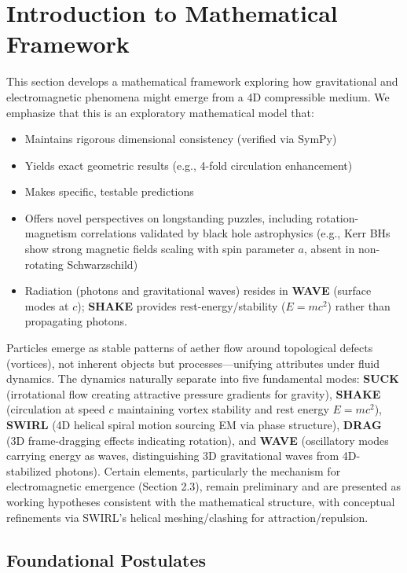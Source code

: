 \section{Introduction to Mathematical Framework}

This section develops a mathematical framework exploring how gravitational and electromagnetic phenomena might emerge from a 4D compressible medium. We emphasize that this is an exploratory mathematical model that:
\begin{itemize}
\item Maintains rigorous dimensional consistency (verified via SymPy)
\item Yields exact geometric results (e.g., 4-fold circulation enhancement)
\item Makes specific, testable predictions
\item Offers novel perspectives on longstanding puzzles, including rotation-magnetism correlations validated by black hole astrophysics (e.g., Kerr BHs show strong magnetic fields scaling with spin parameter $a$, absent in non-rotating Schwarzschild)
\item Radiation (photons and gravitational waves) resides in \textbf{WAVE} (surface modes at $c$); \textbf{SHAKE} provides rest-energy/stability ($E=mc^2$) rather than propagating photons.
\end{itemize}
Particles emerge as stable patterns of aether flow around topological defects (vortices), not inherent objects but processes---unifying attributes under fluid dynamics. The dynamics naturally separate into five fundamental modes: \textbf{SUCK} (irrotational flow creating attractive pressure gradients for gravity), \textbf{SHAKE} (circulation at speed $c$ maintaining vortex stability and rest energy $E=mc^2$), \textbf{SWIRL} (4D helical spiral motion sourcing EM via phase structure), \textbf{DRAG} (3D frame-dragging effects indicating rotation), and \textbf{WAVE} (oscillatory modes carrying energy as waves, distinguishing 3D gravitational waves from 4D-stabilized photons). Certain elements, particularly the mechanism for electromagnetic emergence (Section 2.3), remain preliminary and are presented as working hypotheses consistent with the mathematical structure, with conceptual refinements via SWIRL's helical meshing/clashing for attraction/repulsion.

\subsection{Foundational Postulates}

